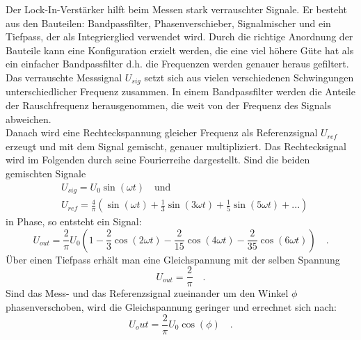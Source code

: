 Der Lock-In-Verstärker  hilft beim Messen stark verrauschter Signale. Er besteht aus den Bauteilen:
 Bandpassfilter, Phasenverschieber, Signalmischer und ein Tiefpass, der als Integrierglied verwendet wird. Durch die richtige Anordnung der Bauteile kann eine Konfiguration erzielt werden, die eine viel höhere Güte hat als ein einfacher Bandpassfilter d.h. die Frequenzen werden genauer heraus gefiltert. \\
 Das verrauschte Messsignal $U_{sig}$ setzt sich aus vielen verschiedenen Schwingungen unterschiedlicher Frequenz zusammen. In einem Bandpassfilter werden die Anteile der Rauschfrequenz herausgenommen, die weit von der Frequenz des Signals abweichen. \\
 Danach wird eine Rechteckspannung gleicher Frequenz als Referenzsignal $U_{ref}$ erzeugt und mit dem Signal gemischt, genauer multipliziert. Das Rechtecksignal wird im Folgenden durch seine Fourierreihe dargestellt. Sind die beiden gemischten Signale
 \begin{align}
 &U_{sig} = U_0  \sin(\omega t) \quad \text{und} \\
 &U_{ref} = \frac{4}{\pi} \left(\sin(\omega t ) + \frac{1}{3} \sin(3 \omega t) + \frac{1}{5} \sin{(5 \omega t)} + ... \right)
 \end{align}
 in Phase, so entsteht ein Signal:
 \begin{equation}
 U_{out} = \frac{2}{\pi}  U_0 \left( 1- \frac{2}{3} \cos{(2 \omega t)} - \frac{2}{15} \cos{(4 \omega t)} - \frac{2}{35} \cos{(6 \omega t)} \right) \quad.
 \end{equation}
 Über einen Tiefpass erhält man eine Gleichspannung mit der selben Spannung 
 \begin{equation}
 U_{out} = \frac{2}{\pi} \quad .
 \end{equation}
 Sind das Mess- und das Referenzsignal zueinander  um den Winkel $\phi$ phasenverschoben, wird die Gleichspannung geringer und errechnet sich nach:
 \begin{equation}
 U_out = \frac{2}{\pi} U_0 \cos{(\phi)} \quad.
 \end{equation}
 	
